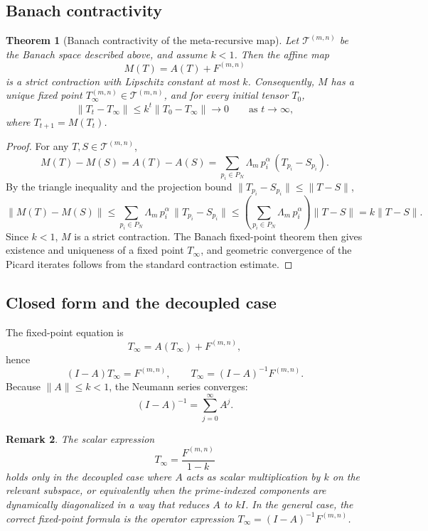 \documentclass[11pt,a4paper]{article}
\newtheorem{theorem}{Theorem}[section]
\newtheorem{remark}[theorem]{Remark}
\newcommand{\Tensor}{\mathcal{T}}
\newcommand{\Id}{I}
\begin{document}
\subsection{Banach contractivity}

\begin{theorem}[Banach contractivity of the meta-recursive map]
Let \(\Tensor^{(m,n)}\) be the Banach space described above, and assume \(k<1\). Then the affine map
\[
M(T)=A(T)+F^{(m,n)}
\]
is a strict contraction with Lipschitz constant at most \(k\). Consequently, \(M\) has a unique fixed point \(T_\infty^{(m,n)}\in \Tensor^{(m,n)}\), and for every initial tensor \(T_0\),
\[
\|T_t-T_\infty\|\le k^t\|T_0-T_\infty\| \to 0
\qquad\text{as } t\to\infty,
\]
where \(T_{t+1}=M(T_t)\).
\end{theorem}

\begin{proof}
For any \(T,S\in \Tensor^{(m,n)}\),
\[
M(T)-M(S)=A(T)-A(S)
=
\sum_{p_i\in P_N}\Lambda_m\, p_i^\alpha\,(T_{p_i}-S_{p_i}).
\]
By the triangle inequality and the projection bound \(\|T_{p_i}-S_{p_i}\|\le \|T-S\|\),
\[
\|M(T)-M(S)\|
\le
\sum_{p_i\in P_N}\Lambda_m\, p_i^\alpha\, \|T_{p_i}-S_{p_i}\|
\le
\left(\sum_{p_i\in P_N}\Lambda_m\, p_i^\alpha\right)\|T-S\|
=
k\|T-S\|.
\]
Since \(k<1\), \(M\) is a strict contraction. The Banach fixed-point theorem then gives existence and uniqueness of a fixed point \(T_\infty\), and geometric convergence of the Picard iterates follows from the standard contraction estimate.
\end{proof}

\subsection{Closed form and the decoupled case}

The fixed-point equation is
\[
T_\infty = A(T_\infty)+F^{(m,n)},
\]
hence
\[
(\Id-A)T_\infty = F^{(m,n)},
\qquad
T_\infty = (\Id-A)^{-1}F^{(m,n)}.
\]
Because \(\|A\|\le k<1\), the Neumann series converges:
\[
(\Id-A)^{-1} = \sum_{j=0}^{\infty}A^j.
\]

\begin{remark}
The scalar expression
\[
T_\infty = \frac{F^{(m,n)}}{1-k}
\]
holds only in the decoupled case where \(A\) acts as scalar multiplication by \(k\) on the relevant subspace, or equivalently when the prime-indexed components are dynamically diagonalized in a way that reduces \(A\) to \(k\Id\). In the general case, the correct fixed-point formula is the operator expression \(T_\infty=(\Id-A)^{-1}F^{(m,n)}\).
\end{remark}
\end{document}
